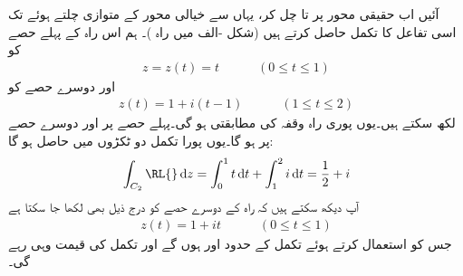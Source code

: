آئیں اب حقیقی محور پر  تا  چل کر، یہاں سے خیالی محور کے متوازی چلتے ہوئے   تک اسی تفاعل  کا تکمل حاصل کرتے ہیں (شکل -الف میں راہ )۔ ہم اس راہ  کے پہلے حصے کو
\begin{align*}
z=z(t)=t\quad \quad\quad (0\le t\le 1)
\end{align*}
اور دوسرے حصے کو
\begin{align*}
z(t)=1+i(t-1)\quad \quad \quad (1\le t\le 2)
\end{align*}
لکھ سکتے ہیں۔یوں پوری راہ وقفہ  کی مطابقتی ہو گی۔پہلے حصے پر  اور دوسرے حصے پر  ہو گا۔یوں پورا تکمل دو ٹکڑوں میں حاصل ہو گا:
\begin{align*}
\int_{C_2} \text{\RL{}}\dif z=\int_0^1t\dif t+\int_1^2 i\dif t=\frac{1}{2}+i
\end{align*}
آپ دیکھ سکتے ہیں کہ راہ کے دوسرے حصے کو درج ذیل بھی لکھا جا سکتا ہے
\begin{align*}
z(t)=1+it\quad\quad\quad(0\le t\le 1)
\end{align*}
جس کو استعمال کرتے ہوئے تکمل کے حدود  اور  ہوں گے اور تکمل کی قیمت وہی رہے گی۔

